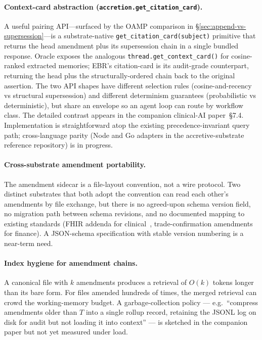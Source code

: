 \documentclass[11pt,a4paper]{article}
\begin{document}
\paragraph{Context-card abstraction (\texttt{accretion.get\_citation\_card}).}
A useful pairing API---surfaced by the OAMP comparison in
\S\ref{sec:append-vs-supersession}---is a substrate-native
\texttt{get\_citation\_card(subject)} primitive that returns the head
amendment plus its supersession chain in a single bundled response. Oracle
exposes the analogous \texttt{thread.get\_context\_card()} for cosine-ranked
extracted memories; EBR's citation-card is its audit-grade counterpart,
returning the head plus the structurally-ordered chain back to the original
assertion. The two API shapes have different selection rules
(cosine-and-recency vs structural supersession) and different determinism
guarantees (probabilistic vs deterministic), but share an envelope so an
agent loop can route by workflow class. The detailed contrast appears in the
companion clinical-AI paper~\S7.4. Implementation is straightforward atop the
existing precedence-invariant query path; cross-language parity (Node and Go
adapters in the accretive-substrate reference repository) is in progress.

\paragraph{Cross-substrate amendment portability.}
The amendment sidecar is a file-layout convention, not a wire protocol. Two distinct
substrates that both adopt the convention can read each other's amendments by file
exchange, but there is no agreed-upon schema version field, no migration path between
schema revisions, and no documented mapping to existing standards (FHIR addenda for
clinical~\cite{fhir2023,addendum2018}, trade-confirmation amendments for finance). A
JSON-schema specification with stable version numbering is a near-term need.

\paragraph{Index hygiene for amendment chains.}
A canonical file with $k$ amendments produces a retrieval of $O(k)$ tokens longer than
its bare form. For files amended hundreds of times, the merged retrieval can crowd the
working-memory budget. A garbage-collection policy --- e.g.\ ``compress amendments older
than $T$ into a single rollup record, retaining the JSONL log on disk for audit but not
loading it into context'' --- is sketched in the companion paper but not yet measured
under load.
\end{document}
